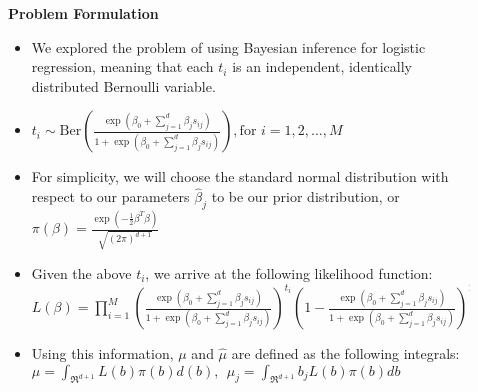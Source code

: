 \documentclass[final,mathserif]{beamer}
\begin{document}
\begin{frame}[fragile]
\begin{columns}[t]
\begin{column}{.31\linewidth}
\end{column}

\begin{column}{.015\linewidth} \end{column} %

\begin{column}{.31\linewidth}

\begin{block}{\Large \alert{\textbf{Problem Formulation}}}
\begin{itemize}

\item We explored the problem of using Bayesian inference for logistic regression, meaning that each $t_i$ is an independent, identically distributed Bernoulli variable.

\item $t_i \sim \text{Ber} \left(\frac{\exp{\left(\beta_0+\sum_{j=1}^d\beta_j s_{ij}\right)}} {1+\exp \left({{\beta_0+\sum_{j=1}^d\beta_js_{ij}}}\right)}\right), \text{for } i=1, 2, \dots , M$

\item  For simplicity, we will choose the standard normal distribution with respect to our parameters $\hat{\beta}_j$ to be our prior distribution, or 
$\pi(\beta)=\frac{\exp{\left({-\frac{1}{2}\beta^T\beta}\right )}}{\sqrt{(2\pi)^{d+1}}}$

\item Given the above $t_i$, we arrive at the following likelihood function:
$L(\beta)=\prod_{i=1}^M \left(\frac{\exp{\left({\beta_0+\sum_{j=1}^d\beta_js_{ij}}\right)}}{1+\exp{\left ({\beta_0+\sum_{j=1}^d\beta_js_{ij}}\right )}}\right)^{t_i} \left(1-\frac{\exp{\left ({\beta_0+\sum_{j=1}^d\beta_js_{ij}}\right)}}{1+\exp{\left ({\beta_0+\sum_{j=1}^d\beta_js_{ij}}\right )}}\right)^{1-t_i}$

\item Using this information, $\mu$ and $\hat{\mu}$ are defined as the following integrals:  $\mu=\int_{\Re^{d+1}}L(b)\pi(b)d(b), ~~\mu_j=\int_{\Re^{d+1}}b_jL(b)\pi(b)db$

\end{itemize}
\end{block}

\vspace{.1in}


\end{column}
\end{columns}
\end{frame}
\end{document}
